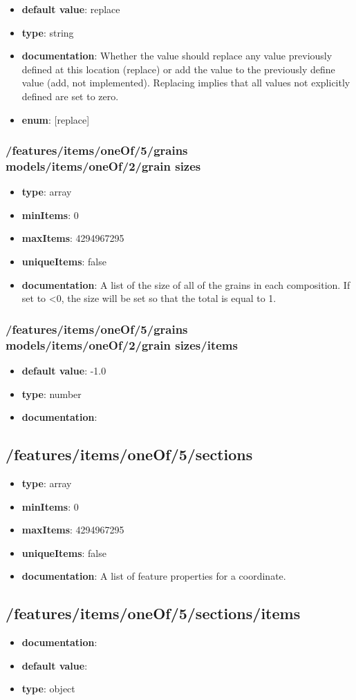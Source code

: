 \begin{itemize}\item {\bf default value}: replace
\item {\bf type}: string
\item {\bf documentation}: Whether the value should replace any value previously defined at this location (replace) or add the value to the previously define value (add, not implemented). Replacing implies that all values not explicitly defined are set to zero.
\item {\bf enum}: [replace]\end{itemize}\subsubsection{/features/items/oneOf/5/grains models/items/oneOf/2/grain sizes}
\begin{itemize}\item {\bf type}: array
\item {\bf minItems}: 0
\item {\bf maxItems}: 4294967295
\item {\bf uniqueItems}: false
\item {\bf documentation}: A list of the size of all of the grains in each composition. If set to <0, the size will be set so that the total is equal to 1.
\end{itemize}\subsubsection{/features/items/oneOf/5/grains models/items/oneOf/2/grain sizes/items}
\begin{itemize}\item {\bf default value}: -1.0
\item {\bf type}: number
\item {\bf documentation}: 
\end{itemize}\subsection{/features/items/oneOf/5/sections}
\begin{itemize}\item {\bf type}: array
\item {\bf minItems}: 0
\item {\bf maxItems}: 4294967295
\item {\bf uniqueItems}: false
\item {\bf documentation}: A list of feature properties for a coordinate.
\end{itemize}\subsection{/features/items/oneOf/5/sections/items}
\begin{itemize}\item {\bf documentation}: 
\item {\bf default value}: 
\item {\bf type}: object
\end{itemize}
